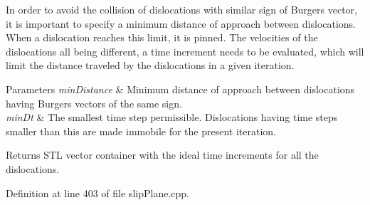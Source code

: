 \-In order to avoid the collision of dislocations with similar sign of \-Burgers vector, it is important to specify a minimum distance of approach between dislocations. \-When a dislocation reaches this limit, it is pinned. \-The velocities of the dislocations all being different, a time increment needs to be evaluated, which will limit the distance traveled by the dislocations in a given iteration. 
\begin{DoxyParams}{\-Parameters}
{\em min\-Distance} & \-Minimum distance of approach between dislocations having \-Burgers vectors of the same sign. \\
\hline
{\em min\-Dt} & \-The smallest time step permissible. \-Dislocations having time steps smaller than this are made immobile for the present iteration. \\
\hline
\end{DoxyParams}
\begin{DoxyReturn}{\-Returns}
\-S\-T\-L vector container with the ideal time increments for all the dislocations. 
\end{DoxyReturn}


\-Definition at line 403 of file slip\-Plane.\-cpp.



